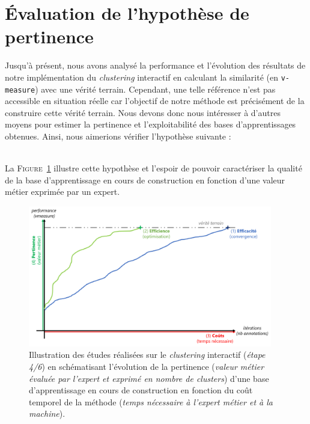 \section{Évaluation de l'hypothèse de pertinence}
\label{section:4.4-HYPOTHESE-PERTINENCE}

	Jusqu'à présent, nous avons analysé la performance et l'évolution des résultats de notre implémentation du \textit{clustering} interactif en calculant la similarité (en \texttt{v-measure}) avec une vérité terrain.
	Cependant, une telle référence n'est pas accessible en situation réelle car l'objectif de notre méthode est précisément de la construire cette vérité terrain.
	Nous devons donc nous intéresser à d'autres moyens pour estimer la pertinence et l'exploitabilité des bases d'apprentissages obtenues.
	Ainsi, nous aimerions vérifier l'hypothèse suivante :
	
	\begin{tcolorbox}[
		title=\faVial~\textbf{Hypothèse de pertinence}~\faVial,
		colback=colorTcolorboxHypothesis!15,
		colframe=colorTcolorboxHypothesis!75,
		width=\linewidth
	]
		 \\
		
		La \textsc{Figure~\ref{figure:4.4-HYPOTHESE-PERTINENCE}} illustre cette hypothèse et l'espoir de pouvoir caractériser la qualité de la base d'apprentissage en cours de construction en fonction d'une valeur métier exprimée par un expert.
		\begin{figure}[H]  %
			\centering
			\includegraphics[width=0.95\textwidth]{figures/hypotheses-04-pertinence}
			\caption{
				Illustration des études réalisées sur le \textit{clustering} interactif (\textit{étape 4/6}) en schématisant l'évolution de la pertinence (\textit{valeur métier évaluée par l'expert et exprimé en nombre de clusters}) d'une base d'apprentissage en cours de construction en fonction du coût temporel de la méthode (\textit{temps nécessaire à l'expert métier et à la machine}).
			}
			\label{figure:4.4-HYPOTHESE-PERTINENCE}
		\end{figure}
	\end{tcolorbox}
		

